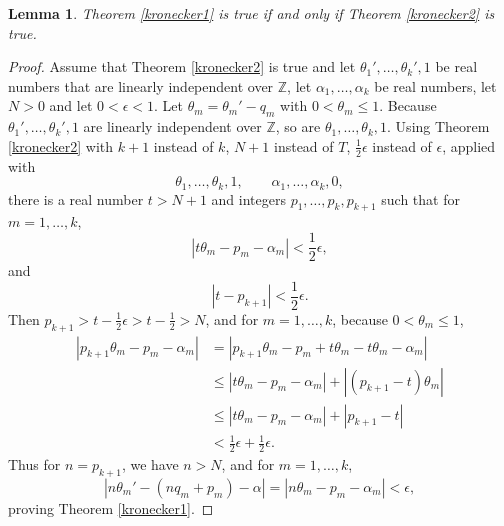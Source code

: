\documentclass{article}
\newtheorem{lemma}[theorem]{Lemma}
\theoremstyle{definition}
\begin{document}
\begin{lemma}
Theorem \ref{kronecker1} is true if and only if Theorem \ref{kronecker2}
is true.
\end{lemma}
\begin{proof}
Assume that Theorem \ref{kronecker2} is true and let
$\theta_1',\ldots,\theta_k',1$ be real numbers that are linearly
independent over $\mathbb{Z}$,  let $\alpha_1,\ldots,\alpha_k$ be real 
numbers, let $N>0$ and let $0<\epsilon<1$. 
Let $\theta_m=\theta_m'-q_m$ with $0<\theta_m \leq 1$.
Because $\theta_1',\ldots,\theta_k',1$ are linearly independent over $\mathbb{Z}$, so are
$\theta_1,\ldots,\theta_k,1$. 
Using Theorem \ref{kronecker2} with $k+1$ instead of $k$, $N+1$ instead of $T$, $\frac{1}{2}\epsilon$
instead of $\epsilon$, applied with
\[
\theta_1,\ldots,\theta_k,1,\qquad \alpha_1,\ldots,\alpha_k,0,
\]
there is a real number $t>N+1$ and integers $p_1,\ldots,p_k,p_{k+1}$ such that for $m=1,\ldots,k$,
\[
|t\theta_m - p_m - \alpha_m | < \frac{1}{2} \epsilon,
\]
and
\[
|t - p _{k+1}| < \frac{1}{2}\epsilon.
\]
Then $p_{k+1}>t-\frac{1}{2}\epsilon>t-\frac{1}{2}>N$, and for $m=1,\ldots,k$, because $0<\theta_m \leq 1$,
\begin{align*}
|p_{k+1} \theta_m - p_m - \alpha_m|&=|p_{k+1} \theta_m -p_m + t\theta_m - t\theta_m -\alpha_m|\\
&\leq |t\theta_m- p_m - \alpha_m| + |(p_{k+1}-t)\theta_m|\\
&\leq |t\theta_m - p_m - \alpha_m| + |p_{k+1}-t|\\
&<\frac{1}{2}\epsilon+\frac{1}{2}\epsilon.
\end{align*}
Thus for $n=p_{k+1}$, we have $n>N$, and for $m=1,\ldots,k$,
\[
|n\theta_m'-(nq_m+p_m) - \alpha|
=
|n\theta_m - p_m - \alpha_m| < \epsilon,
\]
proving Theorem \ref{kronecker1}.


\end{proof}
\end{document}
